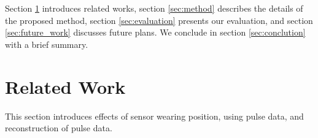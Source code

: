 \documentclass[sigconf]{acmart}
\begin{document}
Section \ref{sec:related} introduces related works, section \ref{sec:method} describes the details of the proposed method, section \ref{sec:evaluation} presents our evaluation, and section \ref{sec:future_work} discusses future plans. We conclude in section \ref{sec:conclution} with a brief summary.



\section{Related Work}
\label{sec:related}
This section introduces effects of sensor wearing position, using pulse data, and reconstruction of pulse data.

\end{document}
